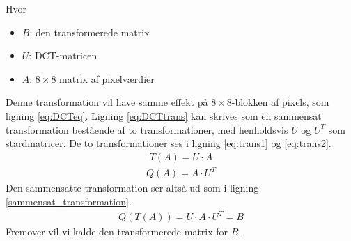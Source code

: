 Hvor
\begin{itemize}
	\item $B$: den transformerede matrix
	\item $U$: DCT-matricen
	\item $A$: $8\times8$ matrix af pixelværdier
\end{itemize}
Denne transformation vil have samme effekt på $8\times8$-blokken af pixels, som ligning \vref{eq:DCTeq}. Ligning \ref{eq:DCTtrans} kan skrives som en sammensat transformation bestående af to transformationer, med henholdsvis $U$ og $U^T$ som stardmatricer. De to transformationer ses i ligning \ref{eq:trans1} og \ref{eq:trans2}.
\begin{align}
T(A)=U \cdot A
\label{eq:trans1}
\end{align}
\begin{align}
Q(A)=A \cdot U^T
\label{eq:trans2}
\end{align}
Den sammensatte transformation ser altså ud som i ligning \ref{sammensat_transformation}.
\begin{align}
Q(T(A))=U \cdot A \cdot U^T=B
\label{sammensat_transformation}
\end{align}
Fremover vil vi kalde den transformerede matrix for $B$.

